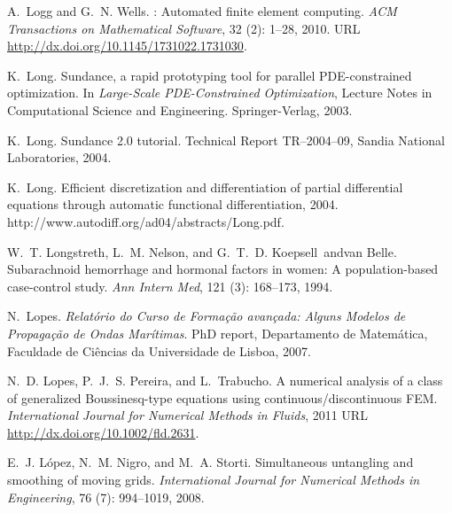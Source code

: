 \begin{thebibliography}{467}
A.~Logg and G.~N. Wells.
: {A}utomated finite element computing.
\newblock \emph{ACM Transactions on Mathematical Software}, 32
  (2): 1--28, 2010.
\newblock URL \url{http://dx.doi.org/10.1145/1731022.1731030}.

K.~Long.
\newblock Sundance, a rapid prototyping tool for parallel {PDE}-constrained
  optimization.
\newblock In \emph{Large-Scale PDE-Constrained Optimization}, Lecture Notes in
  Computational Science and Engineering. Springer-Verlag, 2003.

K.~Long.
\newblock Sundance 2.0 tutorial.
\newblock Technical Report TR--2004--09, Sandia National Laboratories,
  2004{}.

K.~Long.
\newblock Efficient discretization and differentiation of partial differential
  equations through automatic functional differentiation, 2004{}.
\newblock http://www.autodiff.org/ad04/abstracts/Long.pdf.

W.~T. Longstreth, L.~M. Nelson, and G.~T.~D. Koepsell~andvan Belle.
\newblock Subarachnoid hemorrhage and hormonal factors in women: {A}
  population-based case-control study.
\newblock \emph{Ann Intern Med}, 121 (3): 168--173, 1994.

N.~Lopes.
\newblock \emph{{R}elat\'{o}rio do Curso de Forma\c{c}\~{a}o avan\c{c}ada:
  Alguns Modelos de Propaga\c{c}\~{a}o de Ondas Mar\'{i}timas}.
\newblock PhD report, Departamento de Matem\'{a}tica, Faculdade de Ci\^{e}ncias
  da Universidade de Lisboa, 2007.

N.~D. Lopes, P.~J.~S. Pereira, and L.~Trabucho.
\newblock A numerical analysis of a class of generalized {B}oussinesq-type
  equations using continuous/discontinuous {FEM}.
\newblock \emph{International Journal for Numerical Methods in Fluids}, 2011
\newblock  URL \url{http://dx.doi.org/10.1002/fld.2631}.

E.~J. L\'{o}pez, N.~M. Nigro, and M.~A. Storti.
\newblock Simultaneous untangling and smoothing of moving grids.
\newblock \emph{International Journal for Numerical Methods in Engineering},
  76 (7): 994--1019, 2008.


\end{thebibliography}
